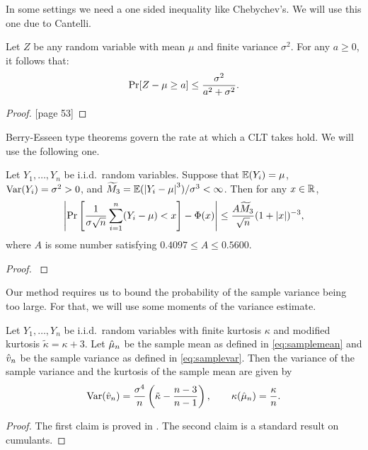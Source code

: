 \documentclass{article}
\begin{document}
In some settings we need a one sided inequality
like Chebychev's. We will use this one due to Cantelli.

\begin{theorem}\label{Can}
Let $Z$ be any random variable with mean $\mu$ and finite variance $\sigma^2$.  For any $a\geq 0$, it
follows that:
\[
\Pr[Z-\mu \geq a]\leq \frac{\sigma^2}{a^2+\sigma^2}.
\]
\end{theorem}
\begin{proof}
\cite{lin:bai:2011}[page 53]
\end{proof}

Berry-Esseen type theorems govern the rate at which
a CLT takes hold. We will use the following one.

\begin{theorem} 
\label{thm:BE} 
Let $Y_1,\dots,Y_n$ be i.i.d.\ random variables.  Suppose that
$\mathbb{E}(Y_i)=\mu$, $\mathrm{Var}(Y_i)=\sigma^2>0$,  and $\widetilde{M}_3=\mathbb{E}(\left|Y_i - \mu\right|^3)/\sigma^3 < \infty$.
Then for any $x\in\mathbb{R}$,
\[
\left|\Pr\left[\frac{1}{\sigma\sqrt{n}}\sum_{i=1}^{n}(Y_i-\mu)<x
\right]-\Phi(x)\right|\leq \frac{A \widetilde{M}_3}{\sqrt{n}}(1+\left|x\right|)^{-3},
\]
where %
$A$ is some number satisfying $0.4097\leq A\leq 0.5600$.
\end{theorem}
\begin{proof}
\cite[Theorem 5.16, p. 168]{Pet95a} 
\end{proof}

Our method requires us to bound the probability of
the sample variance being too large. For that,
we will use some moments of the variance estimate.

\begin{theorem} \label{Varvarthm} Let $Y_1, \ldots, Y_n$ be i.i.d.\ random variables with finite kurtosis $\kappa$ and modified
kurtosis $\tilde \kappa = \kappa+3$.
Let  $\hat{\mu}_n$ be the sample mean as defined in 
\eqref{eq:samplemean}
and $\hat{v}_n$ be the sample variance as defined in \eqref{eq:samplevar}.  Then the variance of the sample variance and the kurtosis of the sample mean are given by 
\[
\mathrm{Var}(\hat{v}_n) = \frac{\sigma^4}{n} \left ( \tilde\kappa  - \frac{n-3}{n-1} \right), \qquad \kappa(\hat{\mu}_n) = \frac{\kappa}{n}.
\]
\end{theorem}
\begin{proof}
The first claim is proved in
\cite[Chapter 7]{mill:1986}.
The second claim is a standard result on cumulants.
\end{proof}
\end{document}
